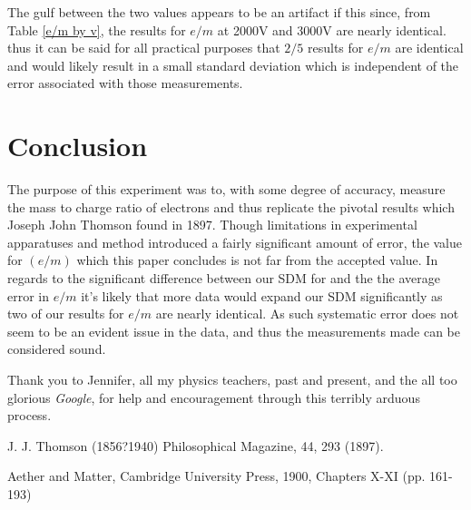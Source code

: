 \documentclass[prb,preprint]{revtex4-1}
\begin{document}
The gulf between the two values appears to be an artifact if this since, from Table \ref{e/m by v}, the results for $e/m$ at 2000V and 3000V are nearly identical. thus it can be said for all practical purposes that $2/5$ results for $e/m$ are identical and would likely result in a small standard deviation which is independent of the error associated with those measurements.

\section{Conclusion}

The purpose of this experiment was to, with some degree of accuracy, measure the mass to charge ratio of electrons and thus replicate the pivotal results which Joseph John Thomson found in 1897. Though limitations in experimental apparatuses and method introduced a fairly significant amount of error, the value for $(e/m)$ which this paper concludes is not far from the accepted value. In regards to the significant difference between our SDM for and the the average error in $e/m$ it's likely that more data would expand our SDM significantly as two of our results for $e/m$ are nearly identical. As such systematic error does not seem to be an evident issue in the data, and thus the measurements made can be considered sound.

\begin{acknowledgements}
Thank you to Jennifer, all my physics teachers, past and present, and the all too glorious \textit{Google}, for help and encouragement through this terribly arduous process.
\end{acknowledgements}

\begin{thebibliography}{99}

 J. J. Thomson (1856?1940) Philosophical Magazine, 44, 293 (1897).

 Aether and Matter, Cambridge University Press, 1900, Chapters X-XI (pp. 161-193)

\end{thebibliography}
\end{document}
